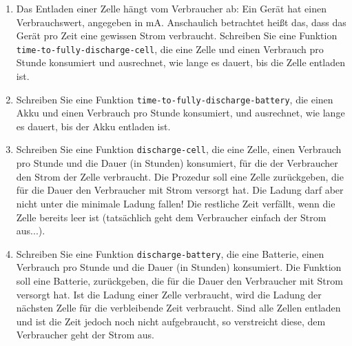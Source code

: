 \begin{aufgabe}
\begin{enumerate}
  \item Das Entladen einer Zelle hängt vom Verbraucher ab: Ein Gerät
    hat einen Verbrauchswert, angegeben in mA.  Anschaulich betrachtet
    heißt das, dass das Gerät pro Zeit eine gewissen Strom verbraucht.
    Schreiben Sie eine Funktion \texttt{time-to-fully-discharge-cell},
    die eine Zelle und einen Verbrauch pro Stunde konsumiert und
    ausrechnet, wie lange es dauert, bis die Zelle entladen ist.

  \item Schreiben Sie eine Funktion
    \texttt{time-to-fully-discharge-battery}, die einen Akku und einen
    Verbrauch pro Stunde konsumiert, und ausrechnet, wie lange es
    dauert, bis der Akku entladen ist.

  \item Schreiben Sie eine Funktion \texttt{discharge-cell}, die eine
    Zelle, einen Verbrauch pro Stunde und die Dauer (in Stunden)
    konsumiert, für die der Verbraucher den Strom der Zelle
    verbraucht.  Die Prozedur soll eine Zelle zurückgeben, die für die
    Dauer den Verbraucher mit Strom versorgt hat.  Die Ladung darf
    aber nicht unter die minimale Ladung fallen! Die restliche Zeit
    verfällt, wenn die Zelle bereits leer ist (tatsächlich geht dem
    Verbraucher einfach der Strom aus...).

  \item Schreiben Sie eine Funktion \texttt{discharge-battery}, die
    eine Batterie, einen Verbrauch pro Stunde und die Dauer (in
    Stunden) konsumiert.  Die Funktion soll eine Batterie,
    zurückgeben, die für die Dauer den Verbraucher mit Strom versorgt
    hat.  Ist die Ladung einer Zelle verbraucht, wird die Ladung der
    nächsten Zelle für die verbleibende Zeit verbraucht.  Sind alle
    Zellen entladen und ist die Zeit jedoch noch nicht aufgebraucht,
    so verstreicht diese, dem Verbraucher geht der Strom aus.

  \end{enumerate}
  
\end{aufgabe}

